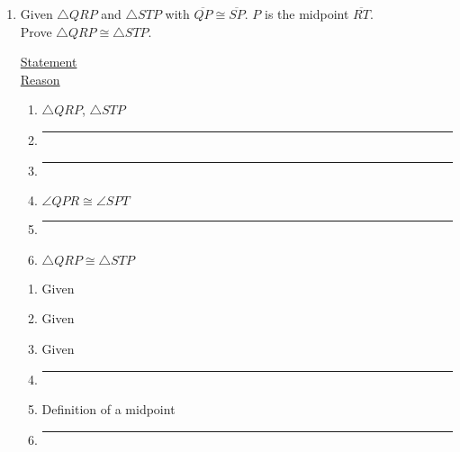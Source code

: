 \documentclass[12pt, twoside]{article}
\begin{document}
\begin{enumerate}

\item Given $\triangle QRP$ and $\triangle STP$ with $\overline{QP} \cong \overline{SP}$. $P$ is the midpoint $\overline{RT}$.\\ Prove $\triangle QRP \cong \triangle STP$.\\[0.5cm]

 \begin{multicols}{2}
   \underline{Statement} \\
   \underline{Reason}
 \end{multicols}
 \begin{multicols}{2}
   \raggedcolumns
   \begin{enumerate}[label={\arabic*)}]
     \item $\triangle QRP$, $\triangle STP$ \vspace{0.3cm}
     \item \rule{4cm}{0.15mm} \vspace{0.3cm}
     \item \rule{4cm}{0.15mm} \vspace{0.3cm}
     \item $\angle QPR \cong \angle SPT$  \vspace{0.3cm}
     \item \rule{4cm}{0.15mm} \vspace{0.3cm}
     \item $\triangle QRP \cong \triangle STP$ \vspace{0.3cm}
   \end{enumerate}
   \begin{enumerate}[label={\arabic*)}]
     \item Given \vspace{0.3cm}
     \item Given \vspace{0.3cm}
     \item Given \vspace{0.3cm}
     \item \rule{4cm}{0.15mm} \vspace{0.3cm}
     \item Definition of a midpoint \vspace{0.3cm}
     \item \rule{4cm}{0.15mm} \vspace{0.3cm}
   \end{enumerate}
 \end{multicols} \vspace{0.5cm}


\end{enumerate}
\end{document}
